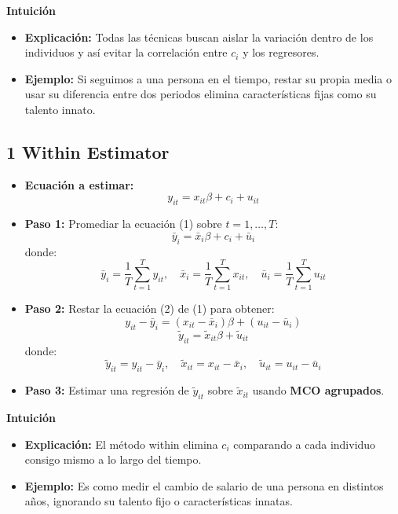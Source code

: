 \documentclass[12pt]{article}
\begin{document}
\noindent\textbf{Intuición}
\begin{itemize}
    \item \textbf{Explicación:} Todas las técnicas buscan aislar la variación dentro de los individuos 
    y así evitar la correlación entre $c_i$ y los regresores.
    \item \textbf{Ejemplo:} Si seguimos a una persona en el tiempo, restar su propia media o usar su diferencia 
    entre dos periodos elimina características fijas como su talento innato.
\end{itemize}

\subsection*{\noindent\textbf{1 Within Estimator}}

\begin{itemize}
    \item \textbf{Ecuación a estimar:} 
    \[
    y_{it} = x_{it}\beta + c_i + u_{it} \tag{1}
    \]
    
    \item \textbf{Paso 1:} Promediar la ecuación (1) sobre $t = 1, \ldots, T$:
    \[
    \bar{y}_i = \bar{x}_i \beta + c_i + \bar{u}_i \tag{2}
    \]
    donde:
    \[
    \bar{y}_i = \frac{1}{T}\sum_{t=1}^T y_{it}, \quad 
    \bar{x}_i = \frac{1}{T}\sum_{t=1}^T x_{it}, \quad 
    \bar{u}_i = \frac{1}{T}\sum_{t=1}^T u_{it}
    \]
    
    \item \textbf{Paso 2:} Restar la ecuación (2) de (1) para obtener:
    \[
    y_{it} - \bar{y}_i = (x_{it} - \bar{x}_i)\beta + (u_{it} - \bar{u}_i)
    \]
    \[
    \tilde{y}_{it} = \tilde{x}_{it}\beta + \tilde{u}_{it}
    \]
    donde: 
    \[
    \tilde{y}_{it} = y_{it} - \bar{y}_i, \quad 
    \tilde{x}_{it} = x_{it} - \bar{x}_i, \quad 
    \tilde{u}_{it} = u_{it} - \bar{u}_i
    \]
    
    \item \textbf{Paso 3:} Estimar una regresión de $\tilde{y}_{it}$ sobre $\tilde{x}_{it}$ usando \textbf{MCO agrupados}.
\end{itemize}

\noindent\textbf{Intuición}
\begin{itemize}
    \item \textbf{Explicación:} El método within elimina $c_i$ comparando a cada individuo consigo mismo a lo largo del tiempo.
    \item \textbf{Ejemplo:} Es como medir el cambio de salario de una persona en distintos años, ignorando su talento fijo o características innatas.
\end{itemize}
\end{document}
